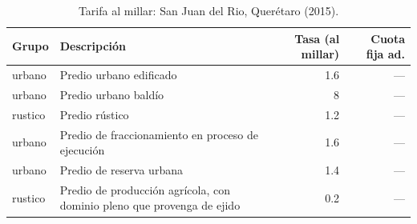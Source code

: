 \begin{table}[htbp]
\centering
\small
\begin{tabular}{llrr}
\toprule
Grupo & Descripción & Tasa (al millar) & Cuota fija ad. \\
\midrule
urbano & Predio urbano edificado & 1.6 & — \\
urbano & Predio urbano baldío & 8 & — \\
rustico & Predio rústico & 1.2 & — \\
urbano & Predio de fraccionamiento en proceso de ejecución & 1.6 & — \\
urbano & Predio de reserva urbana & 1.4 & — \\
rustico & Predio de producción agrícola, con dominio pleno que provenga de ejido & 0.2 & — \\
\bottomrule
\end{tabular}
\caption{Tarifa al millar: San Juan del Rio, Querétaro (2015).}
\label{tab:esquema-tarifa_millar}

\end{table}
